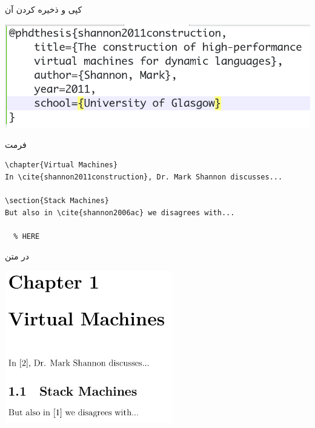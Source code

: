 \begin{frame}{کپی و ذخیره‌ کردن آن}
\begin{center}
\includegraphics[width=\textwidth]{docs/images/copy-save}
\end{center}
\end{frame}

\begin{frame}[fragile]{فرمت }
\begin{latin}
\begin{lstlisting}[keywords={chapter, section, label, ref}, keywordstyle=\color{Mulberry}\textbf]
\chapter{Virtual Machines}
In \cite{shannon2011construction}, Dr. Mark Shannon discusses...

\section{Stack Machines}
But also in \cite{shannon2006ac} we disagrees with...

  % HERE

\end{lstlisting}
\end{latin}
\end{frame}

\begin{frame}{در متن}
\begin{center}
\includegraphics[width=0.55\textwidth, height=0.7\textheight]{docs/images/plain-1}
\end{center}
\end{frame}

